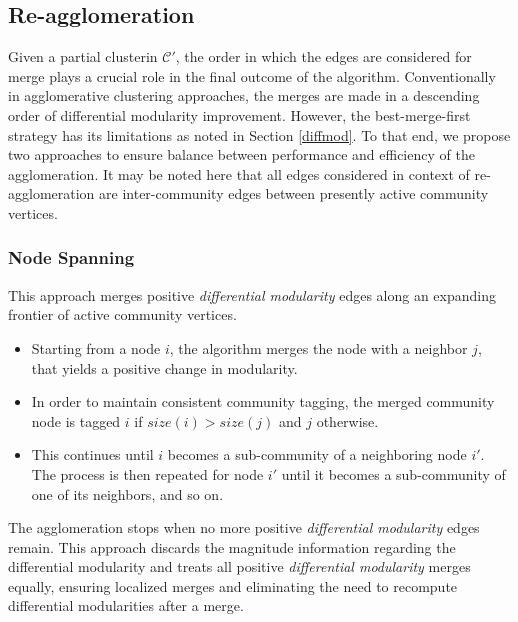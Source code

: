 \documentclass[conference]{IEEEtran}
\begin{document}
\subsection{Re-agglomeration}
Given a partial clusterin $\mathcal{C'}$, the order in which the edges are 
considered for merge plays a crucial role in the final outcome of the algorithm. 
Conventionally in agglomerative clustering approaches, the merges are made in a 
descending order of differential modularity improvement. However, the 
best-merge-first strategy has its limitations as noted in Section 
\ref{diffmod}. To that end, we propose two approaches to ensure balance 
between performance and efficiency of the agglomeration. It may be noted here 
that all edges considered in context of re-agglomeration are inter-community 
edges between presently active community vertices.
\vspace{0.2cm}
\subsubsection{Node Spanning}
This approach merges positive \emph{differential modularity} edges along an 
expanding frontier of active community vertices.
\begin{itemize}
\item Starting from a node $i$, the algorithm 
merges the node with a neighbor $j$, that yields a positive change in 
modularity.
\item In order to maintain consistent community tagging, the merged 
community node is tagged $i$ if $size(i) > size(j)$ and $j$ otherwise. 
\item This continues until $i$ becomes a sub-community of a neighboring node 
$i'$. The process is then repeated for node $i'$ until it becomes a 
sub-community of one of its neighbors, and so on.
\end{itemize}
The agglomeration stops when no more positive \emph{differential modularity} 
edges remain. This approach discards the magnitude information regarding the 
differential modularity and treats all positive \emph{differential modularity} 
merges equally, ensuring localized merges and eliminating the need to recompute 
differential modularities after a merge.
\vspace{0.2cm}
\end{document}
